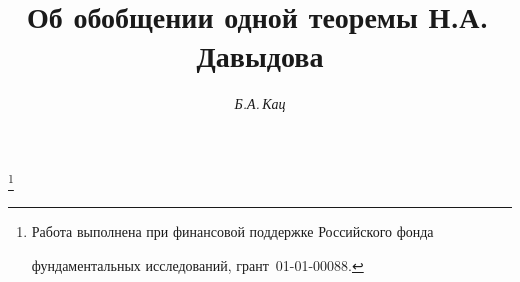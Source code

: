 




%





\newcommand{\tts}[1]{}







\setcounter{page}{39}















\author{\it Б.А.\,Кац}




\title{Об обобщении одной теоремы Н.А.\,Давыдова}


\thanks{Работа выполнена при финансовой поддержке Российского фонда


фундаментальных исследований, грант \No\,01-01-00088.}





\date{}




\pagestyle{plain} %







\maketitle


\label{begin}








